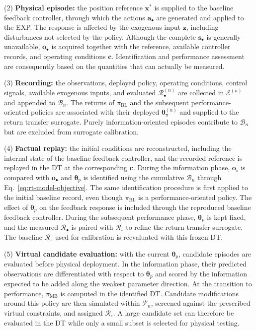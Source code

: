 \documentclass[journal]{IEEEtran}
\begin{document}
(2) \textbf{Physical episode:} the position reference $\mathbf{x}^{\ast}$ is supplied to the baseline feedback controller, through which the actions $\mathbf a_\bullet$ are generated and applied to the EXP. The response is affected by the exogenous input $\mathbf z$, including disturbances not selected by the policy. Although the complete $\mathbf s_\bullet$ is generally unavailable, $\mathbf o_\bullet$ is acquired together with the reference, available controller records, and operating conditions $\mathbf c$. Identification and performance assessment are consequently based on the quantities that can actually be measured. 

(3) \textbf{Recording:} the observations, deployed policy, operating conditions, control signals, available exogenous inputs, and evaluated $\mathcal R_\bullet^{(n)}$ are collected in $\mathcal E^{(n)}$ and appended to $\mathcal B_n$. The returns of $\pi_{\mathrm{BL}}$ and the subsequent performance-oriented policies are associated with their deployed $\boldsymbol{\theta}_\pi^{(n)}$ and supplied to the return transfer surrogate. Purely information-oriented episodes contribute to $\mathcal B_n$ but are excluded from surrogate calibration. 

(4) \textbf{Factual replay:} the initial conditions are reconstructed, including the internal state of the baseline feedback controller, and the recorded reference is replayed in the DT at the corresponding $\mathbf c$. During the information phase, $\overline{\mathbf o}_\circ$ is compared with $\mathbf o_\bullet$ and $\boldsymbol{\theta}_p$ is identified using the cumulative $\mathcal B_n$ through Eq.~\eqref{eq:rt-model-objective}. The same identification procedure is first applied to the initial baseline record, even though $\pi_{\mathrm{BL}}$ is a performance-oriented policy. The effect of $\boldsymbol{\theta}_p$ on the feedback response is included through the reproduced baseline feedback controller. During the subsequent performance phase, $\boldsymbol{\theta}_p$ is kept fixed, and the measured $\mathcal R_\bullet$ is paired with $\mathcal R_\circ$ to refine the return transfer surrogate. The baseline $\mathcal R_\circ$ used for calibration is reevaluated with this frozen DT.

(5) \textbf{Virtual candidate evaluation:} with the current $\boldsymbol{\theta}_p$, candidate episodes are evaluated before physical deployment. In the information phase, their predicted observations are differentiated with respect to $\boldsymbol{\theta}_p$ and scored by the information expected to be added along the weakest parameter direction. At the transition to performance, $\pi_{\mathrm{MB}}$ is computed in the identified DT. Candidate modifications around this policy are then simulated within $\mathcal P_n$, screened against the prescribed virtual constraints, and assigned $\mathcal R_\circ$. A large candidate set can therefore be evaluated in the DT while only a small subset is selected for physical testing.
\end{document}
